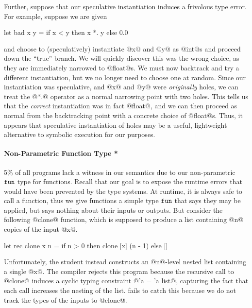 Further, suppose that our speculative instantiation induces a frivolous
type error.
%
For example, suppose we are given
%
\begin{code}
  let bad x y =
    if x < y then
      x *. y
    else
      0.0
\end{code}
%
and choose to (speculatively) instantiate @x@ and @y@ as @int@s and proceed
down the ``true'' branch.
%
We will quickly discover this was the wrong choice, as they are immediately
narrowed to @float@s.
%
We must now backtrack and try a different instantiation, but we no
longer need to choose one at random.
%
Since our instantiation was speculative, and @x@ and @y@
were \emph{originally} holes, we can treat the @*.@ operator as a normal
narrowing point with two holes.
%
This tells us that the \emph{correct} instantiation was in fact @float@,
and we can then proceed as normal from the backtracking point with a
concrete choice of @float@s.
%
Thus, it appears that speculative instantiation of holes may be a
useful, lightweight alternative to symbolic execution for our purposes.



\paragraph{Non-Parametric Function Type *}
%
5\% of all programs lack a witness in our semantics due to our
non-parametric $\mathtt{fun}$ type for functions.
%
Recall that our goal is to expose the runtime errors that would have
been prevented by the type systems.
%
At runtime, it is always safe to call a function, thus we give functions
a simple type $\mathtt{fun}$ that says they may be applied, but says nothing
about their inputs or outputs.
%
But consider the following @clone@ function, which is supposed to
produce a list containing @n@ copies of the input @x@.
%
%
\begin{code}
  let rec clone x n =
    if n > 0 then
      clone [x] (n - 1)
    else
      []
\end{code}
%
Unfortunately, the student instead constructs an @n@-level nested list
containing a single @x@.
%
The \ocaml compiler rejects this program because the recursive call to
@clone@ induces a cyclic typing constraint @'a = 'a list@, capturing the
fact that each call increases the nesting of the list.
%
\toolname fails to catch this because we do not track the types of the
inputs to @clone@.

